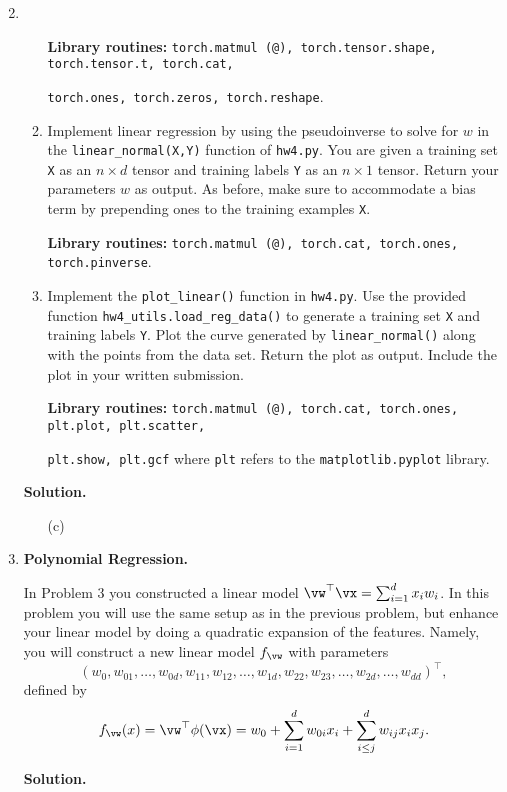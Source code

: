 \documentclass{article}
\theoremstyle{definition}
\theoremstyle{remark}
\newenvironment{Q}
{%
  \clearpage
  \item
  }
  {%
    \phantom{s} %
    \bigskip
    \textbf{Solution.}
  }
\begin{document}
\begin{enumerate}[font={\Large\bfseries},left=0pt]
\begin{Q}
\begin{enumerate}
          \textbf{Library routines:} \texttt{torch.matmul (@), torch.tensor.shape, torch.tensor.t, torch.cat,} 

          \texttt{torch.ones, torch.zeros, torch.reshape}.

        \item Implement linear regression by using the pseudoinverse to solve for $w$ in the \texttt{linear\_normal(X,Y)} function of \texttt{hw4.py}. You are given a training set \texttt{X} as an $n \times d$ tensor and training labels \texttt{Y} as an $n \times 1$ tensor. Return your parameters $w$ as output. As before, make sure to accommodate a bias term by prepending ones to the training examples \texttt{X}.

          \textbf{Library routines:} \texttt{torch.matmul (@), torch.cat, torch.ones, torch.pinverse}.

        \item Implement the \texttt{plot\_linear()} function in \texttt{hw4.py}.  Use the provided function \texttt{hw4\_utils.load\_reg\_data()} to generate a training set \texttt{X} and training labels \texttt{Y}. Plot the curve generated by \texttt{linear\_normal()} along with the points from the data set.  Return the plot as output.  Include the plot in your written submission.

          \textbf{Library routines:} \texttt{torch.matmul (@), torch.cat, torch.ones, plt.plot, plt.scatter,}

          \texttt{plt.show, plt.gcf} where \texttt{plt} refers to the \texttt{matplotlib.pyplot} library.
      \end{enumerate}
    \end{Q}
    \begin{enumerate}
    \item[(c)]
  \end{enumerate}
    

    \begin{Q}
  \textbf{\Large Polynomial Regression.}

  In Problem 3 you constructed a linear model $\vw^\top \vx = \sum_{i=1}^d x_i w_i$.  In this problem you will use the same setup as in the previous problem, but enhance your linear model by doing a quadratic expansion of the features.  Namely, you will construct a new linear model $f_{\vw}$ with parameters
  \[
    (w_{0}, w_{01},\dots,w_{0d},w_{11}, w_{12},\dots,w_{1d},w_{22}, w_{23},\dots,w_{2d},\dots, w_{dd})^\top,
  \]
    defined by
  	\begin{align*}
  	f_{\vw}(x) = \vw^\top \phi(\vx) = w_0 + \sum_{i=1}^d w_{0i} x_i + \sum_{i\leq j}^dw_{ij} x_ix_j.
  	\end{align*}
  	

\end{Q}
\end{enumerate}
\end{document}
